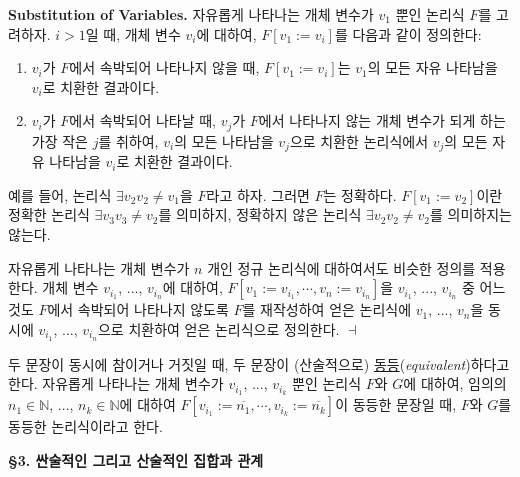 \documentclass[12pt]{paper}
\newenvironment{context}[1][]{\noindent \textbf{{#1}.}}{\hfill $ \dashv $}
\begin{document}
  \begin{context}[Substitution of Variables]
    자유롭게 나타나는 개체 변수가 $v_{1}$ 뿐인 논리식 $F$를 고려하자.
    $i > 1$일 때, 개체 변수 $v_{i}$에 대하여, $F \left[ v_{1} := v_{i} \right]$를 다음과 같이 정의한다:
    \begin{enumerate}
      \item $v_{i}$가 $F$에서 속박되어 나타나지 않을 때, $F \left[ v_{1} := v_{i} \right]$는 $v_{1}$의 모든 자유 나타남을 $v_{i}$로 치환한 결과이다.
      \item $v_{i}$가 $F$에서 속박되어 나타날 때, $v_{j}$가 $F$에서 나타나지 않는 개체 변수가 되게 하는 가장 작은 $j$를 취하여,
      $v_{i}$의 모든 나타남을 $v_{j}$으로 치환한 논리식에서 $v_{j}$의 모든 자유 나타남을 $v_{i}$로 치환한 결과이다.
    \end{enumerate}

    예를 들어, 논리식 $\exists v_{2} v_{2} \neq v_{1}$을 $F$라고 하자.
    그러면 $F$는 정확하다.
    $F \left[ v_{1} := v_{2} \right]$이란 정확한 논리식 $\exists v_{3} v_{3} \neq v_{2}$를 의미하지, 정확하지 않은 논리식 $\exists v_{2} v_{2} \neq v_{2}$를 의미하지는 않는다.

    자유롭게 나타나는 개체 변수가 $n$ 개인 정규 논리식에 대하여서도 비슷한 정의를 적용한다.
    개체 변수 $v_{i_{1}}$, ..., $v_{i_{n}}$에 대하여,
    $F \left[ v_{1} := v_{i_{1}} , \cdots , v_{n} := v_{i_{n}} \right]$을
    $v_{i_{1}}$, ..., $v_{i_{n}}$ 중 어느 것도 $F$에서 속박되어 나타나지 않도록 $F$를 재작성하여 얻은 논리식에
    $v_{1}$, ..., $v_{n}$을 동시에 $v_{i_{1}}$, ..., $v_{i_{n}}$으로 치환하여 얻은 논리식으로 정의한다. 
  \end{context}

  두 문장이 동시에 참이거나 거짓일 때, 두 문장이 (산술적으로) \underline{동등}(\textit{equivalent})하다고 한다.
  자유롭게 나타나는 개체 변수가 $v_{i_{1}}$, ..., $v_{i_{k}}$ 뿐인 논리식 $F$와 $G$에 대하여,
  임의의 $n_{1} \in \mathbb{N}$, ..., $n_{k} \in \mathbb{N}$에 대하여 $F \left[ v_{i_{1}} := \overline{n_{1}} , \cdots , v_{i_{k}} := \overline{n_{k}} \right]$이 동등한 문장일 때,
  $F$와 $G$를 동등한 논리식이라고 한다.

  \noindent \textbf{\S 3. 싼술적인 그리고 산술적인 집합과 관계}
\end{document}
